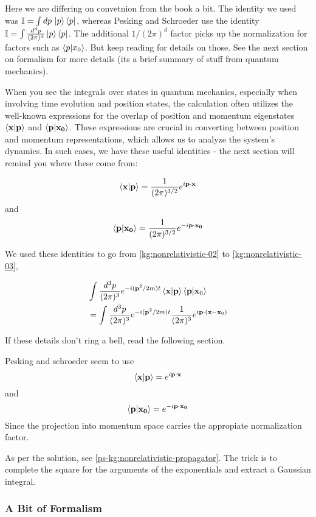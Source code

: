 Here we are differing on convetnion from the book a bit.
The identity we used was $\mathbb{I} = \int dp\, \ket{p}\bra{p}$, whereas Pesking and Schroeder use the identity
$\mathbb{I} = \int \frac{d^dp}{(2\pi)^d} \ket{p}\bra{p}$.
The additional $1/(2\pi)^d$ factor picks up the normalization for factors such as $\braket{p | x_0}$.
But keep reading for details on those.
See the next section on formalism for more details (its a brief summary of stuff from quantum mechanics).


When you see the integrals over states in quantum mechanics, especially when involving time evolution and position states,
the calculation often utilizes the well-known expressions for the overlap of position and momentum eigenstates
$\braket{\boldsymbol{\mathbf{x}} | \boldsymbol{\mathbf{p}}}$ and $\braket{\boldsymbol{\mathbf{p}} | \boldsymbol{\mathbf{x_0}}}$.
These expressions are crucial in converting between position and momentum representations,
which allows us to analyze the system's dynamics.
In such cases, we have these useful identities - the next section will remind you where these come from:

$$
\braket{\boldsymbol{\mathbf{x}} | \boldsymbol{\mathbf{p}}} = \frac{1}{(2\pi)^{3/2}} e^{i\boldsymbol{\mathbf{p}}\cdot\boldsymbol{\mathbf{x}}}
$$
and 
$$
\braket{\boldsymbol{\mathbf{p}} | \boldsymbol{\mathbf{x_0}}} = \frac{1}{(2\pi)^{3/2}} e^{-i\boldsymbol{\mathbf{p}}\cdot\boldsymbol{\mathbf{x_0}}}
$$

We used these identities to go from \ref{kg:nonrelativistic-02} to \ref{kg:nonrelativistic-03},

\begin{align*}
& \int \frac{d^3p}{(2\pi)^3} e^{-i(\boldsymbol{\mathbf{p}}^2/2m)t} \braket{\boldsymbol{\mathbf{x}} | \boldsymbol{\mathbf{p}}} \braket{\boldsymbol{\mathbf{p}} | \boldsymbol{\mathbf{x}}_0} \\
&= \int \frac{d^3p}{(2\pi)^3} e^{-i(\boldsymbol{\mathbf{p}}^2/2m)t} \frac{1}{(2\pi)^3} e^{i\boldsymbol{\mathbf{p}}\cdot(\boldsymbol{\mathbf{x}}-\boldsymbol{\mathbf{x}}_0)} 
\end{align*}

If these details don't ring a bell, read the following section.

Pesking and schroeder seem to use
$$
\braket{\boldsymbol{\mathbf{x}} | \boldsymbol{\mathbf{p}}} = e^{i\boldsymbol{\mathbf{p}}\cdot\boldsymbol{\mathbf{x}}}
$$
and 
$$
\braket{\boldsymbol{\mathbf{p}} | \boldsymbol{\mathbf{x_0}}} = e^{-i\boldsymbol{\mathbf{p}}\cdot\boldsymbol{\mathbf{x_0}}}
$$
Since the projection into momentum space carries the appropiate normalization factor.


As per the solution, see \ref{ps-kg:nonrelativistic-propagator}.
The trick is to complete the square for the arguments of the exponentials and extract a Gaussian integral.


\subsubsection{A Bit of Formalism}


